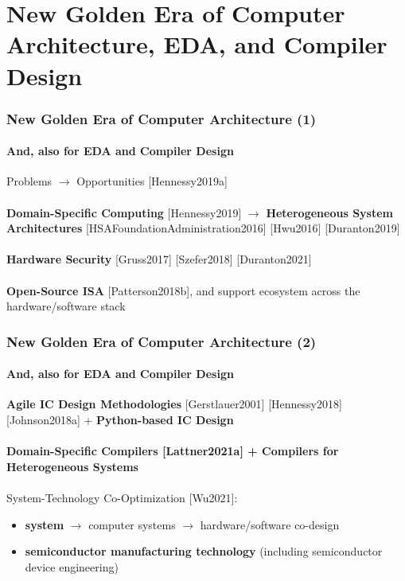 \documentclass[xcolor={usenames,dvipsnames},hyperref={hyperindex,bookmarks}]{beamer}
\begin{document}
\section{New Golden Era of Computer Architecture, EDA, and Compiler Design}




\begin{frame}
	\frametitle{New Golden Era of Computer Architecture (1)}
	\framesubtitle{And, also for EDA and Compiler Design}
	
	Problems $\rightarrow$ Opportunities [Hennessy2019a] \\
	\ \\
	{\bf Domain-Specific Computing} [Hennessy2019] $\rightarrow$ {\bf Heterogeneous System Architectures} [HSAFoundationAdministration2016] [Hwu2016] [Duranton2019] \\
	\ \\
	{\bf Hardware Security} [Gruss2017] [Szefer2018] [Duranton2021] \\
	\ \\
	{\bf Open-Source ISA} [Patterson2018b], and support ecosystem across the hardware/software stack \\
	
\end{frame}

\begin{frame}
	\frametitle{New Golden Era of Computer Architecture (2)}
	\framesubtitle{And, also for EDA and Compiler Design}
	
	{\bf Agile IC Design Methodologies} [Gerstlauer2001] [Hennessy2018] [Johnson2018a] + {\bf Python-based IC Design} \\
	\ \\
	{\bf Domain-Specific Compilers [Lattner2021a] + Compilers for Heterogeneous Systems} \\
	\ \\
	System-Technology Co-Optimization [Wu2021]:
	\begin{itemize}
	\item {\bf system} $\rightarrow$ computer systems $\rightarrow$ hardware/software co-design
	\item {\bf semiconductor manufacturing technology} (including semiconductor device engineering)
	\end{itemize}

\end{frame}
\end{document}

